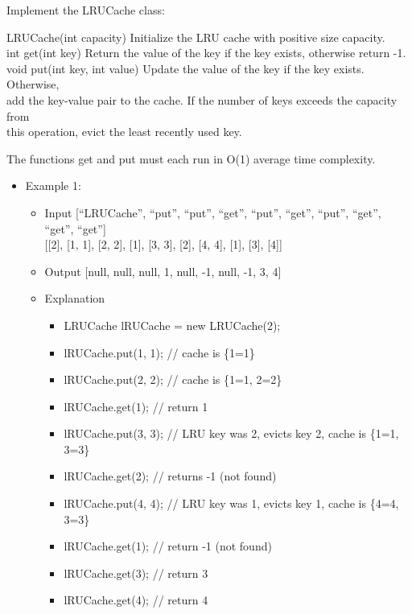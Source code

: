 \documentclass[11pt]{article}
\providecommand{\tightlist}{%
      \setlength{\itemsep}{0pt}\setlength{\parskip}{0pt}}
\begin{document}
Implement the LRUCache class:

LRUCache(int capacity) Initialize the LRU cache with positive size
capacity.\\
int get(int key) Return the value of the key if the key exists,
otherwise return -1.\\
void put(int key, int value) Update the value of the key if the key
exists. Otherwise,\\
add the key-value pair to the cache. If the number of keys exceeds the
capacity from\\
this operation, evict the least recently used key.

The functions get and put must each run in O(1) average time complexity.

\begin{itemize}
\item
  Example 1:

  \begin{itemize}
  \item
    Input {[}``LRUCache'', ``put'', ``put'', ``get'', ``put'', ``get'',
    ``put'', ``get'', ``get'', ``get''{]}\\
    {[}{[}2{]}, {[}1, 1{]}, {[}2, 2{]}, {[}1{]}, {[}3, 3{]}, {[}2{]},
    {[}4, 4{]}, {[}1{]}, {[}3{]}, {[}4{]}{]}
  \item
    Output {[}null, null, null, 1, null, -1, null, -1, 3, 4{]}
  \item
    Explanation

    \begin{itemize}
    \tightlist
    \item
      LRUCache lRUCache = new LRUCache(2);
    \item
      lRUCache.put(1, 1); // cache is \{1=1\}
    \item
      lRUCache.put(2, 2); // cache is \{1=1, 2=2\}
    \item
      lRUCache.get(1); // return 1
    \item
      lRUCache.put(3, 3); // LRU key was 2, evicts key 2, cache is
      \{1=1, 3=3\}
    \item
      lRUCache.get(2); // returns -1 (not found)
    \item
      lRUCache.put(4, 4); // LRU key was 1, evicts key 1, cache is
      \{4=4, 3=3\}
    \item
      lRUCache.get(1); // return -1 (not found)
    \item
      lRUCache.get(3); // return 3
    \item
      lRUCache.get(4); // return 4
    \end{itemize}
  \end{itemize}
\end{itemize}
\end{document}
